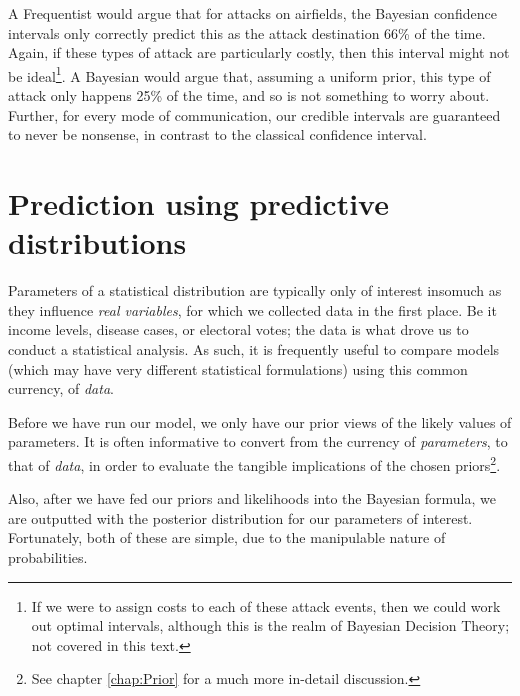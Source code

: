 \documentclass[11pt,fullpage]{book}
\begin{document}
A Frequentist would argue that for attacks on airfields, the Bayesian confidence intervals only correctly predict this as the attack destination 66\% of the time. Again, if these types of attack are particularly costly, then this interval might not be ideal\footnote{If we were to assign costs to each of these attack events, then we could work out optimal intervals, although this is the realm of Bayesian Decision Theory; not covered in this text.}. A Bayesian would argue that, assuming a uniform prior, this type of attack only happens 25\% of the time, and so is not something to worry about. Further, for every mode of communication, our credible intervals are guaranteed to never be nonsense, in contrast to the classical confidence interval.


\section{Prediction using predictive distributions}
Parameters of a statistical distribution are typically only of interest insomuch as they influence \textit{real variables}, for which we collected data in the first place. Be it income levels, disease cases, or electoral votes; the data is what drove us to conduct a statistical analysis. As such, it is frequently useful to compare models (which may have very different statistical formulations) using this common currency, of \textit{data}.

Before we have run our model, we only have our prior views of the likely values of parameters. It is often informative to convert from the currency of \textit{parameters}, to that of \textit{data}, in order to evaluate the tangible implications of the chosen priors\footnote{See chapter \ref{chap:Prior} for a much more in-detail discussion.}.

Also, after we have fed our priors and likelihoods into the Bayesian formula, we are outputted with the posterior distribution for our parameters of interest. Fortunately, both of these are simple, due to the manipulable nature of probabilities.
\end{document}
